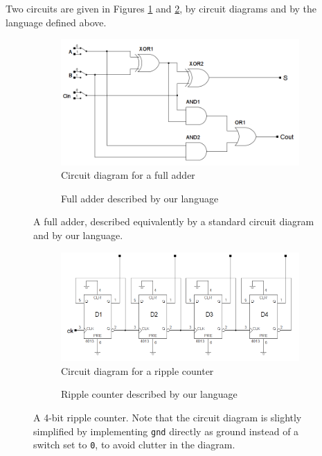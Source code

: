 Two circuits are given in Figures \ref{fig:example1} and \ref{fig:example2},
by circuit diagrams and by the language defined above. 

\begin{figure}[htbp]
  \begin{subfigure}{\textwidth}
    \centering
    \includegraphics[scale=.33]{examples/fulladder.png}
    \caption{Circuit diagram for a full adder}
  \end{subfigure}
  \begin{subfigure}{\textwidth}
    
    \caption{Full adder described by our language}
  \end{subfigure}
  \caption{A full adder, described equivalently by a standard circuit
    diagram and by our language.}
  \label{fig:example1}
\end{figure}

\begingroup
\makeatletter
\setlength{\@fptop}{0pt}
\setlength{\@fpbot}{0pt plus 1fil}
\makeatother
\begin{figure}[p]
  \begin{subfigure}{\textwidth}
    \centering
    \includegraphics[scale=.33]{examples/ripplecounter.png}
    \caption{Circuit diagram for a ripple counter}
  \end{subfigure}
  \begin{subfigure}{\textwidth}
    
    \caption{Ripple counter described by our language}
  \end{subfigure}
  \caption{A 4-bit ripple counter. Note that the circuit diagram is
    slightly simplified by implementing \texttt{gnd} directly as
    ground instead of a switch set to \texttt{0}, to avoid clutter
    in the diagram.}
  \label{fig:example2}
\end{figure}
\clearpage %
\endgroup
